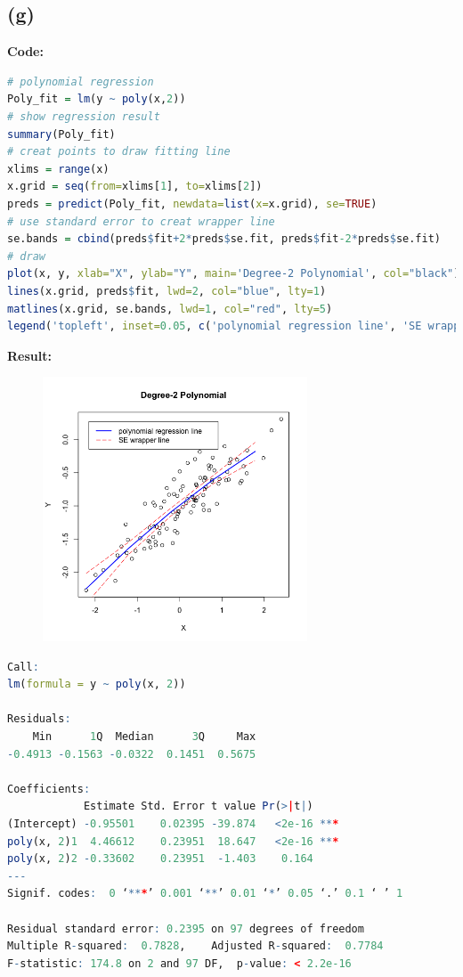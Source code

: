 \documentclass[twoside]{homework}
\begin{document}
\subsection*{(g)}
\textbf{Code:}
\begin{lstlisting}[language=R]
# polynomial regression
Poly_fit = lm(y ~ poly(x,2))
# show regression result
summary(Poly_fit)
# creat points to draw fitting line
xlims = range(x)
x.grid = seq(from=xlims[1], to=xlims[2])
preds = predict(Poly_fit, newdata=list(x=x.grid), se=TRUE)
# use standard error to creat wrapper line
se.bands = cbind(preds$fit+2*preds$se.fit, preds$fit-2*preds$se.fit)
# draw 
plot(x, y, xlab="X", ylab="Y", main='Degree-2 Polynomial', col="black")
lines(x.grid, preds$fit, lwd=2, col="blue", lty=1)
matlines(x.grid, se.bands, lwd=1, col="red", lty=5)
legend('topleft', inset=0.05, c('polynomial regression line', 'SE wrapper line'), lwd=c(2, 1), lty=c(1, 5), col=c('blue', 'red'), bty = "o")
\end{lstlisting}
\textbf{Result:}
\begin{figure}[htb]
\begin{center}
\includegraphics[width=0.7\textwidth]{HW1_P3_g.png}
\end{center}
\label{fig:HW1_P3_g}
\end{figure}
\begin{lstlisting}[language=R]
Call:
lm(formula = y ~ poly(x, 2))

Residuals:
    Min      1Q  Median      3Q     Max 
-0.4913 -0.1563 -0.0322  0.1451  0.5675 

Coefficients:
            Estimate Std. Error t value Pr(>|t|)    
(Intercept) -0.95501    0.02395 -39.874   <2e-16 ***
poly(x, 2)1  4.46612    0.23951  18.647   <2e-16 ***
poly(x, 2)2 -0.33602    0.23951  -1.403    0.164    
---
Signif. codes:  0 ‘***’ 0.001 ‘**’ 0.01 ‘*’ 0.05 ‘.’ 0.1 ‘ ’ 1

Residual standard error: 0.2395 on 97 degrees of freedom
Multiple R-squared:  0.7828,	Adjusted R-squared:  0.7784 
F-statistic: 174.8 on 2 and 97 DF,  p-value: < 2.2e-16
\end{lstlisting}
\end{document}
